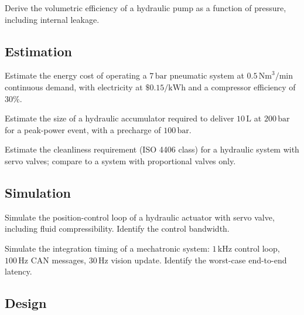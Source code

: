 \begin{exercise}
Derive the volumetric efficiency of a hydraulic pump as a function of pressure, including internal leakage.
\end{exercise}

\subsection*{Estimation}

\begin{exercise}
Estimate the energy cost of operating a $7\,\text{bar}$ pneumatic system at $0.5\,\text{Nm}^3/\text{min}$ continuous demand, with electricity at $\$0.15/\text{kWh}$ and a compressor efficiency of $30\%$.
\end{exercise}

\begin{exercise}
Estimate the size of a hydraulic accumulator required to deliver $10\,\text{L}$ at $200\,\text{bar}$ for a peak-power event, with a precharge of $100\,\text{bar}$.
\end{exercise}

\begin{exercise}
Estimate the cleanliness requirement (ISO 4406 class) for a hydraulic system with servo valves; compare to a system with proportional valves only.
\end{exercise}

\subsection*{Simulation}

\begin{exercise}
Simulate the position-control loop of a hydraulic actuator with servo valve, including fluid compressibility. Identify the control bandwidth.
\end{exercise}

\begin{exercise}
Simulate the integration timing of a mechatronic system: $1\,\text{kHz}$ control loop, $100\,\text{Hz}$ CAN messages, $30\,\text{Hz}$ vision update. Identify the worst-case end-to-end latency.
\end{exercise}

\subsection*{Design}


